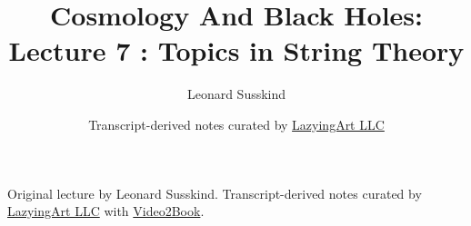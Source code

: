 \documentclass[11pt,oneside]{book}
\begin{document}
\frontmatter
\title{Cosmology And Black Holes: Lecture 7 : Topics in String Theory}
\author{Leonard Susskind}
\date{Transcript-derived notes curated by \href{https://lazying.art}{LazyingArt LLC}}
\maketitle
\begin{center}
\small Original lecture by Leonard Susskind. Transcript-derived notes curated by \href{https://lazying.art}{LazyingArt LLC} with \href{https://github.com/lachlanchen/Video2Book}{Video2Book}.
\end{center}
\clearpage
\mainmatter

\end{document}
